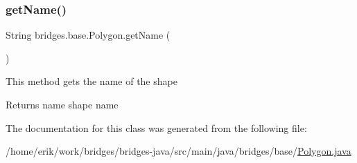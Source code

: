 \subsubsection{\texorpdfstring{get\+Name()}{getName()}}
{\footnotesize\ttfamily String bridges.\+base.\+Polygon.\+get\+Name (\begin{DoxyParamCaption}{ }\end{DoxyParamCaption})}

This method gets the name of the shape

\begin{DoxyReturn}{Returns}
name shape name 
\end{DoxyReturn}


The documentation for this class was generated from the following file\+:\begin{DoxyCompactItemize}
\item 
/home/erik/work/bridges/bridges-\/java/src/main/java/bridges/base/\hyperlink{_polygon_8java}{Polygon.\+java}\end{DoxyCompactItemize}
